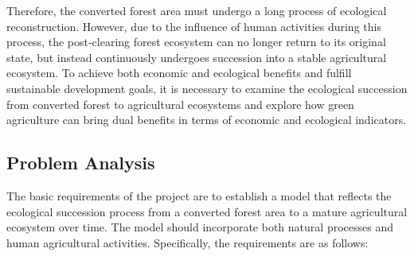\documentclass{HZNUMCM}
\begin{document}
    Therefore, the converted forest area must undergo a long process of ecological reconstruction. 
    However, due to the influence of human activities during this process, 
    the post-clearing forest ecosystem can no longer return to its original state, 
    but instead continuously undergoes succession into a stable agricultural ecosystem. 
    To achieve both economic and ecological benefits and fulfill sustainable development goals, 
    it is necessary to examine the ecological succession from converted forest to agricultural ecosystems and explore how green agriculture can bring dual benefits in terms of economic and ecological indicators.
      
    \subsection{Problem Analysis}
      The basic requirements of the project are to establish a model that reflects the ecological succession process from a converted forest area to a mature agricultural ecosystem over time. 
      The model should incorporate both natural processes and human agricultural activities. 
      Specifically, the requirements are as follows:
\end{document}
